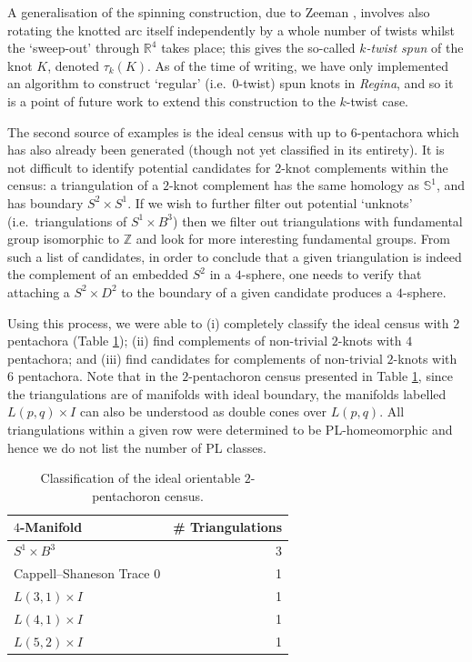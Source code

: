 \documentclass[pdflatex,sn-mathphys-num]{sn-jnl}
\theoremstyle{thmstyleone}%
\theoremstyle{thmstyletwo}%
\theoremstyle{thmstylethree}%
\theoremstyle{remark}
\begin{document}
A generalisation of the spinning construction, due to Zeeman \cite{Zeeman-TwistingSpunKnots}, involves also rotating the knotted arc itself independently by a whole number of twists whilst the `sweep-out' through $\mathbb{R}^4$ takes place; this gives the so-called \emph{$k$-twist spun} of the knot $K$, denoted $\tau_k(K)$. As of the time of writing, we have only implemented an algorithm to construct `regular' (i.e.\ $0$-twist) spun knots in \emph{Regina}, and so it is a point of future work to extend this construction to the $k$-twist case.

The second source of examples is the ideal census with up to $6$-pentachora which has also already been generated (though not yet classified in its entirety). It is not difficult to identify potential candidates for $2$-knot complements within the census: a triangulation of a $2$-knot complement has the same homology as $\mathbb{S}^1$, and has boundary $S^2\times S^1$. If we wish to further filter out potential `unknots' (i.e.\ triangulations of $S^1\times B^3$) then we filter out triangulations with fundamental group isomorphic to $\mathbb{Z}$ and look for more interesting fundamental groups. From such a list of candidates, in order to conclude that a given triangulation is indeed the complement of an embedded $S^2$ in a $4$-sphere, one needs to verify that attaching a $S^2\times D^2$ to the boundary of a given candidate produces a $4$-sphere. 

Using this process, we were able to (i) completely classify the ideal census with $2$ pentachora (Table \ref{tab:ideal2pClassification}); (ii) find complements of non-trivial $2$-knots with $4$ pentachora; and (iii) find candidates for complements of non-trivial $2$-knots with $6$ pentachora. Note that in the $2$-pentachoron census presented in Table \ref{tab:ideal2pClassification}, since the triangulations are of manifolds with ideal boundary, the manifolds labelled $L(p,q)\times I$ can also be understood as double cones over $L(p,q)$. 
All triangulations within a given row were determined to be PL-homeomorphic and hence we do not list the number of PL classes.

\begin{table}[h]
	\caption{Classification of the ideal orientable $2$-pentachoron census.}
	\label{tab:ideal2pClassification}
	\begin{tabular}{lr}
		\toprule
		$4$-Manifold & \# Triangulations\\
		\midrule
 $S^1\times B^3$ & 3\\
 Cappell--Shaneson Trace $0$ & 1 \\
 $L(3,1)\times I$ &  1\\
 $L(4,1)\times I$ &  1\\
 $L(5,2)\times I$ & 1 \\
	\bottomrule
	\end{tabular}
\end{table}
\end{document}
